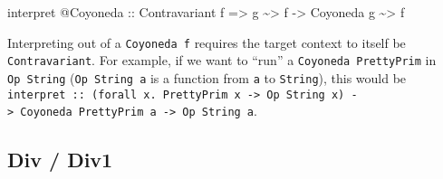 \documentclass[]{article}
\newenvironment{Shaded}{}{}
\newcommand{\DataTypeTok}[1]{\textcolor[rgb]{0.56,0.13,0.00}{#1}}
\newcommand{\NormalTok}[1]{#1}
\newcommand{\OperatorTok}[1]{\textcolor[rgb]{0.40,0.40,0.40}{#1}}
\newcommand{\OtherTok}[1]{\textcolor[rgb]{0.00,0.44,0.13}{#1}}
\begin{document}
\begin{itemize}
\begin{Shaded}
\begin{Highlighting}[]
\NormalTok{interpret }\OperatorTok{@}\DataTypeTok{Coyoneda}
\OtherTok{    ::} \DataTypeTok{Contravariant}\NormalTok{ f}
    \OtherTok{=\textgreater{}}\NormalTok{ g }\OperatorTok{\textasciitilde{}\textgreater{}}\NormalTok{ f}
    \OtherTok{{-}\textgreater{}} \DataTypeTok{Coyoneda}\NormalTok{ g }\OperatorTok{\textasciitilde{}\textgreater{}}\NormalTok{ f}
\end{Highlighting}
\end{Shaded}

  Interpreting out of a \texttt{Coyoneda\ f} requires the target context to
  itself be \texttt{Contravariant}. For example, if we want to ``run'' a
  \texttt{Coyoneda\ PrettyPrim} in \texttt{Op\ String} (\texttt{Op\ String\ a}
  is a function from \texttt{a} to \texttt{String}), this would be
  \texttt{interpret\ ::\ (forall\ x.\ PrettyPrim\ x\ -\textgreater{}\ Op\ String\ x)\ -\textgreater{}\ Coyoneda\ PrettyPrim\ a\ -\textgreater{}\ Op\ String\ a}.
\end{itemize}

\subsection{Div / Div1}\label{div-div1}
\end{document}
